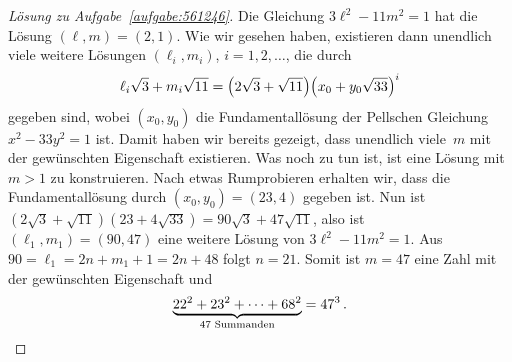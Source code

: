 \begin{proof}[Lösung zu Aufgabe~\ref{aufgabe:561246}]
	Die Gleichung $3\ell^2-11m^2=1$ hat die Lösung $(\ell,m)=(2,1)$. Wie wir gesehen haben, existieren dann unendlich viele weitere Lösungen $(\ell_i,m_i)$, $i=1,2,\dotsc$, die durch
	\begin{equation*}
		\ell_i\sqrt{3}+m_i\sqrt{11}=\parens*{2\sqrt{3}+\sqrt{11}}\parens*{x_0+y_0\sqrt{33}}^i
	\end{equation*}
	gegeben sind, wobei $(x_0,y_0)$ die Fundamentallösung der Pellschen Gleichung $x^2-33y^2=1$ ist. Damit haben wir bereits gezeigt, dass unendlich viele~$m$ mit der gewünschten Eigenschaft existieren. Was noch zu tun ist, ist eine Lösung mit $m>1$ zu konstruieren. Nach etwas Rumprobieren erhalten wir, dass die Fundamentallösung durch $(x_0,y_0)=(23,4)$ gegeben ist. Nun ist $(2\sqrt{3}+\sqrt{11})(23+4\sqrt{33})=90\sqrt{3}+47\sqrt{11}$, also ist $(\ell_1,m_1)=(90,47)$ eine weitere Lösung von $3\ell^2-11m^2=1$. Aus $90=\ell_1=2n+m_1+1=2n+48$ folgt $n=21$. Somit ist $m=47$ eine Zahl mit der gewünschten Eigenschaft und
	\begin{equation*}
		\underbrace{22^2+23^2+\dotsb+68^2}_{\text{$47$ Summanden}}=47^3\,.\qedhere
	\end{equation*}
\end{proof}

